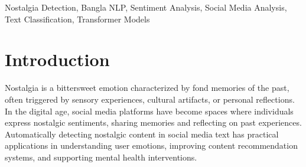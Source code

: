 \documentclass[conference]{IEEEtran}
\begin{document}
\begin{abstract}
\small{Nostalgia, a complex emotional response to past experiences, plays a significant role in human psychology and social interaction. Automatically detecting nostalgic content in social media text has applications in sentiment analysis, mental health monitoring, and content recommendation. However, nostalgia detection remains underexplored, especially for low-resource languages like Bangla. This paper presents a comprehensive benchmark study for binary nostalgia detection in Bangla social media text. We curate a dataset of approximately 25,000 manually labeled Bangla text samples from social media platforms. We evaluate a diverse set of models including classical machine learning approaches with TF-IDF features (Logistic Regression, SVM, Decision Trees, Random Forest, KNN), deep learning models (CNN, LSTM, BiLSTM with attention), and transformer-based models (mBERT, XLM-RoBERTa). Using stratified 5-fold cross-validation, we achieve the best macro F1-score of 0.794 with XLM-RoBERTa, closely followed by mBERT (0.763) and Logistic Regression (0.755). Our analysis reveals that while transformer models achieve the highest performance, classical approaches remain highly competitive, offering practical advantages in training efficiency and interpretability for this task.}
\end{abstract}




\begin{IEEEkeywords}
\small{Nostalgia Detection, Bangla NLP, Sentiment Analysis, Social Media Analysis, Text Classification, Transformer Models}
\end{IEEEkeywords}


\section{Introduction}
\label{sec:introduction}

Nostalgia is a bittersweet emotion characterized by fond memories of the past, often triggered by sensory experiences, cultural artifacts, or personal reflections. In the digital age, social media platforms have become spaces where individuals express nostalgic sentiments, sharing memories and reflecting on past experiences. Automatically detecting nostalgic content in social media text has practical applications in understanding user emotions, improving content recommendation systems, and supporting mental health interventions.
\end{document}
